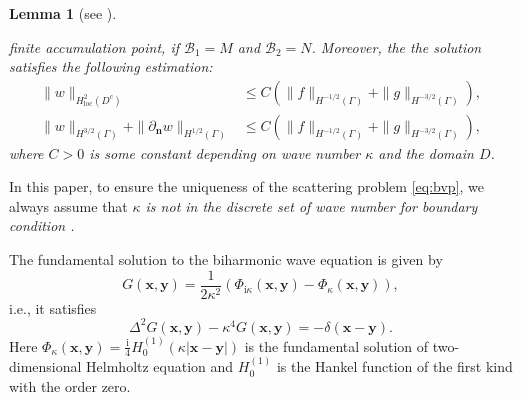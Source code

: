 \documentclass[10pt,a4paper]{article}
\numberwithin{equation}{section}
\newtheorem{lemma}[theorem]{Lemma}
\begin{document}
\begin{lemma}[see \cite{bourgeois_well_2020}]
\begin{itemize}
finite accumulation point, if $\mathcal{B}_1= M$ and $\mathcal{B}_2=N$. Moreover, the the solution satisfies the following estimation:
    \begin{align*}
  \|w\|_{H^2_{\mathrm{loc}}(D^{c})} 
 & \leq C (\|f \|_{H^{-1/2}(\Gamma)} + \|g \|_{H^{-3/2}(\Gamma)}),\\
 \| w\|_{H^{3/2}(\Gamma)} + \|\partial_{\bm{n}} w \|_{H^{1/2}(\Gamma)}
 &\leq C (\|f \|_{H^{-1/2}(\Gamma)} + \|g \|_{H^{-3/2}(\Gamma)}),
    \end{align*}
    where $C>0$ is some constant depending on wave number $\kappa$ and the domain $D$.
    \end{itemize}
\end{lemma}
In this paper, to ensure the uniqueness of the scattering problem \eqref{eq:bvp}, we always assume that \emph{$\kappa$ is not in the discrete set of wave number for boundary condition \uppercase\expandafter{}.}


The fundamental solution to the biharmonic wave equation is given by
\begin{equation}
  \label{eq:funda-bi}
  G(\bm{x},\bm{y}) = \frac{1}{2\kappa^{2}}
  \left(\Phi_{\mathrm{i}\kappa}(\bm{x},\bm{y})- \Phi_{\kappa}(\bm{x},\bm{y})\right),
\end{equation}
i.e., it satisfies
\begin{equation*}
\Delta^{2} G( \bm{ x }, \bm{ y }) -\kappa^4 G( \bm{ x },\bm{ y }) = -\delta(\bm{ x }-\bm{ y }).
\end{equation*}
Here $\Phi_{\kappa}(\bm{ x },\bm{ y })=\frac{\mathrm{ i }}{4} H^{(1)}_0(\kappa | \bm{ x }-\bm{ y } |)$ is the fundamental solution of two-dimensional Helmholtz equation and $H^{(1)}_0$ is the Hankel function of the first kind with the order zero.
\end{document}
